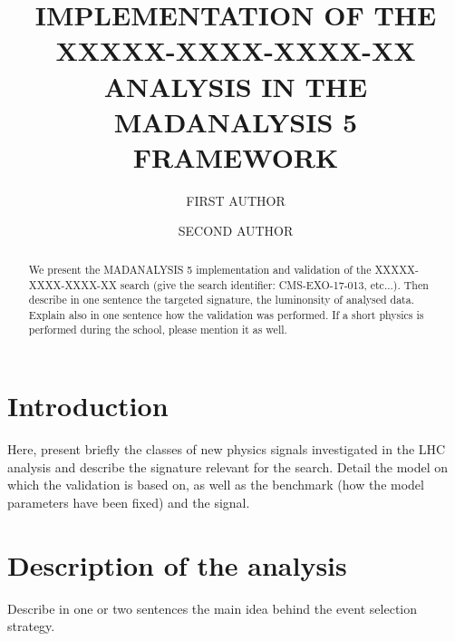 \documentclass{ws-mpla}
\begin{document}

\catchline{}{}{}{}{}

\title{IMPLEMENTATION OF THE XXXXX-XXXX-XXXX-XX ANALYSIS IN THE MADANALYSIS 5 FRAMEWORK}

\author{\footnotesize FIRST AUTHOR}
\address{
  University Department, University Name, Address\\
  City, State ZIP/Zone, Country}

\author{SECOND AUTHOR}
\address{
  University Department, University Name, Address\\
  City, State ZIP/Zone, Country}

\maketitle


\begin{abstract}
We present the MADANALYSIS 5 implementation and validation of the
XXXXX-XXXX-XXXX-XX search (give the search identifier: CMS-EXO-17-013, etc...).
Then describe in one sentence the targeted signature, the luminonsity of
analysed data. Explain also in one sentence how the validation was performed.
If a short physics is performed during the school, please mention it as well.
\end{abstract}


\section{Introduction}
Here, present briefly the classes of new physics signals investigated in the LHC
analysis and describe the signature relevant for the search. Detail the model on
which the validation is based on, as well as the benchmark (how the model
parameters have been fixed) and the signal.

\section{Description of the analysis}
Describe in one or two sentences the main idea behind the event selection
strategy.
\end{document}
